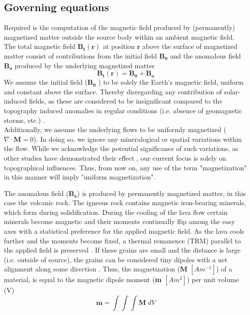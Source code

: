 \subsection{Governing equations}
Required is the computation of the magnetic field produced by (permanently) magnetized matter outside the source body within an ambient magnetic field.
The total magnetic field $\mathbf{B_t(r)}$ at position $\mathbf{r}$ above the surface of magnetized matter consist of contributions from the initial field $\mathbf{B_0}$ and the anomalous field $\mathbf{B_a}$ produced by the underlying magnetized matter
\begin{equation}
    \label{eq:Bsum}
    \mathbf{B_t(r)} =  \mathbf{B_0} + \mathbf{B_a} 
\end{equation}
We assume the initial field ($\mathbf{B_0}$ ) to be solely the Earth's magnetic field, uniform and constant above the surface. Thereby disregarding any contribution of solar-induced fields, as these are considered to be insignificant compared to the topography induced anomalies in regular conditions (i.e. absence of geomagnetic storms, etc.) \parencite{Baag95}. \\
Additionally, we assume the underlying flows to be uniformly magnetized ($\nabla \cdot \mathbf{M} = 0$).  In doing so, we ignore any mineralogical or spatial variations within the flow. While we acknowledge the potential significance of such variations, as other studies have demonstrated their effect \parencite{Knudsen03}, our current focus is solely on topographical influences. Thus, from now on, any use of the term "magnetization" in this manner will imply "uniform magnetization".
 \par 
The anomalous field  ($\mathbf{B_a}$) is produced by permanently magnetized matter, in this case the volcanic rock. The igneous rock contains magnetic iron-bearing minerals, which form during solidification. During the cooling of the lava flow certain minerals become magnetic and their moments continually flip among the easy axes with a statistical preference for the applied magnetic field. As the lava cools further and the moments become fixed, a thermal remanence (TRM) parallel to the applied field is preserved \parencite{TAUXE}. If these grains are small and the distance is large (i.e. outside of source), the grains can be considered tiny dipoles with a net alignment along some direction \parencite{REITZ}. Thus, the magnetization (\textbf{M} $[Am^{-1}]$) of a material, is equal to the magnetic dipole moment (\textbf{m $[Am^{2}]$}) per unit volume (V)
\begin{equation} \label{eq:Magnetization}
\mathbf{m} = \int\int\int \mathbf{M} \; dV
\end{equation}
